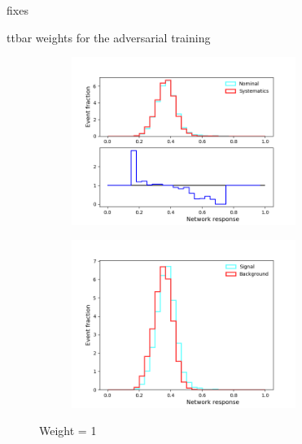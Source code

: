 \documentclass[10pt, UKenglish]{beamer}
\begin{document}
\begin{frame}{fixes}
\end{frame}

\begin{frame}{ttbar weights for the adversarial training}
    \begin{figure}[htbp]
    \caption{Weight = 0}
    \centering
    \begin{subfigure}[b]{0.47\textwidth}
        \includegraphics[width=0.8\textwidth]{separation_adversaryweight0.png}
        \label{fig:simple:final:sepa}
    \end{subfigure}
\quad
    \begin{subfigure}[b]{0.47\textwidth}
        \includegraphics[width=0.8\textwidth]{separation_discriminatorweight0.png}
        \label{fig:simple:final:syst}
    \end{subfigure}
    \end{figure}
    \vspace{-0.7cm}
    \begin{figure}[htbp]
    \caption{Weight = 1}

\end{figure}
\end{frame}
\end{document}
